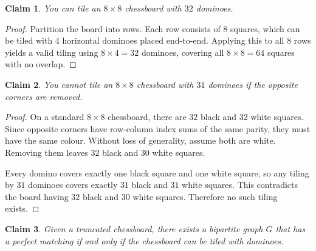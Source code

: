 \documentclass{article}
\newtheorem{claim}{Claim}
\begin{document}
\begin{claim}
    You can tile an $8 \times 8$ chessboard with $32$ dominoes.
\end{claim}

\begin{proof}
    Partition the board into rows. Each row consists of $8$ squares,
    which can be tiled with $4$ horizontal dominoes placed end-to-end.
    Applying this to all $8$ rows yields a valid tiling using 
    $8 \times 4 = 32$ dominoes, covering all $8 \times 8 = 64$ squares
    with no overlap.
\end{proof}

\begin{claim}
    You cannot tile an $8 \times 8$ chessboard with $31$ dominoes
    if the opposite corners are removed.
\end{claim}

\begin{proof}
    On a standard $8 \times 8$ chessboard, there are $32$ black and $32$ white 
    squares. Since opposite corners have row-column index sums of the same 
    parity, they must have the same colour. Without loss of generality, assume 
    both are white. Removing them leaves $32$ black and $30$ white squares.

    \medskip
    
    Every domino covers exactly one black square and one white square,
    so any tiling by $31$ dominoes covers exactly $31$ black and $31$ white squares. 
    This contradicts the board having $32$ black and $30$ white squares. 
    Therefore no such tiling exists.
\end{proof}

\begin{claim}
    Given a truncated chessboard, there exists a bipartite graph $G$
    that has a perfect matching if and only if the chessboard can be
    tiled with dominoes.
\end{claim}
\end{document}
